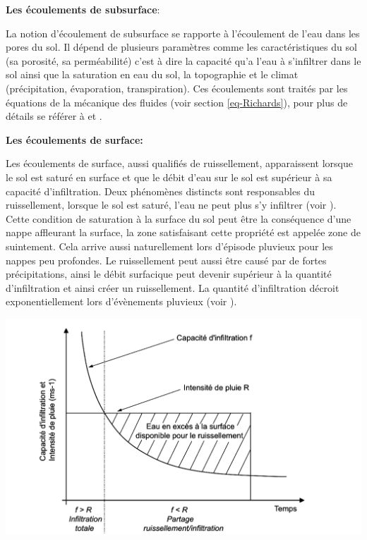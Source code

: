 \documentclass[a4paper,11pt]{article}
\numberwithin{equation}{section}
\begin{document}
\vspace{0.7cm}

\noindent\textbf{Les écoulements de subsurface}:

La notion d'écoulement de subsurface se rapporte à l'écoulement de l'eau dans les pores du sol. Il dépend de plusieurs paramètres comme les caractéristiques du sol (sa porosité, sa perméabilité) c'est à dire la capacité qu'a l'eau à s'infiltrer dans le sol ainsi que la saturation en eau du sol, la topographie et le climat (précipitation, évaporation, transpiration). Ces écoulements sont traités par les équations de la mécanique des fluides (voir section  \ref{eq-Richards}), pour plus de détails se référer à \cite{maquin2016developpement} et \cite{marsily_de1986quantitative}. 

\vspace{0.7cm}

\noindent\textbf{Les écoulements de surface:}

Les écoulements de surface, aussi qualifiés de ruissellement, apparaissent lorsque le sol est saturé en surface et que le débit d'eau sur le sol est supérieur à sa capacité d'infiltration. Deux phénomènes distincts sont responsables du ruissellement, lorsque le sol est saturé, l’eau ne peut plus s’y infiltrer (voir \cite{cappus1960etude}). Cette condition de saturation à la surface du sol peut être la conséquence d'une nappe affleurant la surface, la zone satisfaisant cette propriété est appelée zone de suintement. Cela arrive aussi naturellement lors d'épisode pluvieux pour les nappes peu profondes. Le ruissellement peut aussi être causé par de fortes précipitations, ainsi le débit surfacique peut devenir supérieur à la quantité d'infiltration et ainsi créer un ruissellement. La quantité d'infiltration décroit exponentiellement lors d'évènements pluvieux (voir \cite{horton1933role}).  

\begin{center}
	\captionsetup{type=figure}
	\includegraphics[scale=0.2]{ruissellement.png}
\end{center} 
\end{document}
